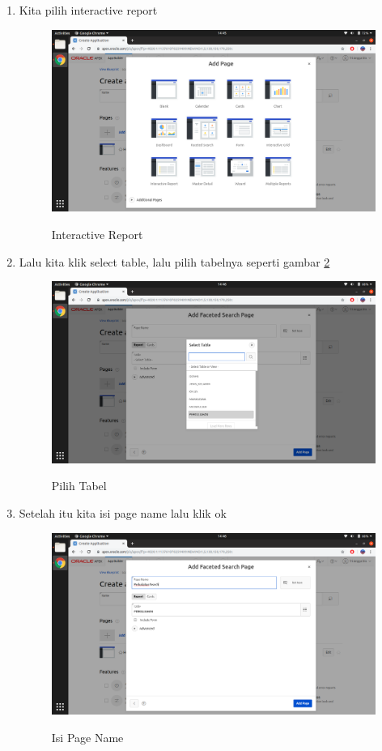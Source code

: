\begin{enumerate}
\item Kita pilih interactive report
\begin{figure}[H]
\centering
\caption{Interactive Report}
\includegraphics[width=1\textwidth]{figures/26}
\label{26}
\end{figure}

\item Lalu kita klik select table, lalu pilih tabelnya seperti gambar \ref{28}
\begin{figure}[H]
\centering
\caption{Pilih Tabel}
\includegraphics[width=1\textwidth]{figures/28}
\label{28}
\end{figure}

\item Setelah itu kita isi page name lalu klik ok
\begin{figure}[H]
\centering
\caption{Isi Page Name}
\includegraphics[width=1\textwidth]{figures/29}
\label{29}
\end{figure}


\end{enumerate}
